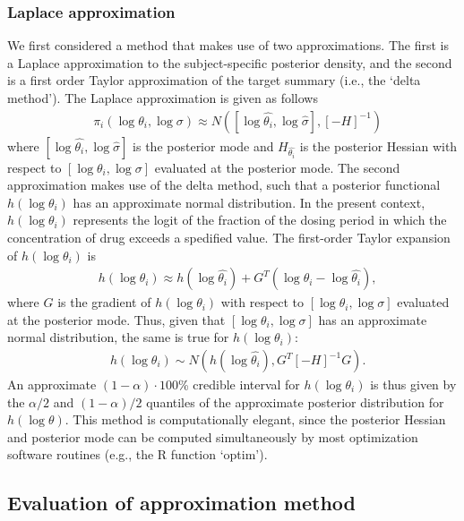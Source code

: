 \documentclass{article}\usepackage[]{graphicx}\usepackage[]{color}
\begin{document}
\subsubsection{Laplace approximation}
We first considered a method that makes use of two approximations. The first is a Laplace approximation to the subject-specific posterior density, and the second is a first order Taylor approximation of the target summary (i.e., the `delta method'). The Laplace approximation is given as follows
\begin{align}
&\pi_i(\log \theta_i, \log \sigma) \approx N([\log \hat{\theta_i},\log \hat{\sigma}], [-H]^{-1})
\end{align}
\noindent where $[\log \hat{\theta_i},\log \hat{\sigma}]$ is the posterior mode and $H_{\hat{\theta_i}}$ is the posterior Hessian with respect to $[\log \theta_i, \log \sigma]$ evaluated at the posterior mode. The second approximation makes use of the delta method, such that a posterior functional $h(\log \theta_i)$ has an approximate normal distribution. In the present context, $h(\log \theta_i)$ represents the logit of the fraction of the dosing period in which the concentration of drug exceeds a spedified value. The first-order Taylor expansion of $h(\log \theta_i)$ is
\begin{align}
&h(\log \theta_i) \approx  h(\log \hat{\theta_i}) + G^T(\log \theta_i - \log \hat{\theta_i}),
\end{align}
\noindent where $G$ is the gradient of $h(\log \theta_i)$ with respect to $[\log \theta_i, \log \sigma]$ evaluated at the posterior mode. Thus, given that $[\log \theta_i, \log \sigma]$ has an approximate normal distribution, the same is true for $h(\log \theta_i)$:
\begin{align}
&h(\log \theta_i) \sim N(h(\log \hat{\theta_i}), G^T[-H]^{-1}G).
\end{align}
\noindent An approximate $(1-\alpha)\cdot 100$\% credible interval for $h(\log \theta_i)$ is thus given by the $\alpha/2$ and $(1-\alpha)/2$ quantiles of the approximate posterior distribution for $h(\log \theta)$. This method is computationally elegant, since the posterior Hessian and posterior mode can be computed simultaneously by most optimization software routines (e.g., the R function `optim').

\subsection{Evaluation of approximation method}
\end{document}

